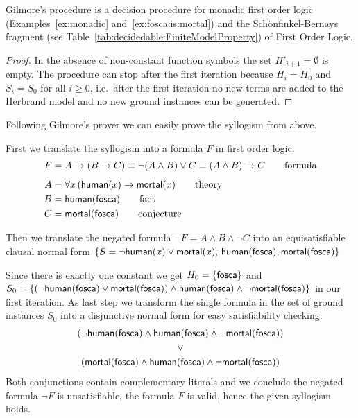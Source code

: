 \begin{lemma}
	Gilmore's procedure is a decision procedure for monadic first order logic
	(Examples~\ref{ex:monadic} and~\ref{ex:fosca:is:mortal})
	and the Schönfinkel-Bernays fragment
	(see Table~\ref{tab:decidedable:FiniteModelProperty})
	of First Order Logic.
\end{lemma}

\begin{proof}
	In the absence of non-constant function symbols the set \( H'_{i+1} = \emptyset \) is empty.
	The procedure can stop after the first iteration because
	\( H_i = H_0 \) and \( S_i = S_0 \) for all \( i\geq0 \),
	i.e.~after the first iteration
	no new terms are added to the Herbrand model
	and no new ground instances can be generated.
\end{proof}

Following Gilmore's prover we can easily prove the syllogism from above.

\begin{example}\label{ex:fosca:is:mortal}
	First we translate the syllogism into a formula \( F \) in first order logic.
	\begin{align*}
	F &= A \rightarrow (B \rightarrow C) \equiv \lnot(A\land B) \lor C \equiv (A\land B)\rightarrow C
	\tag*{formula}
	\\[0.5em]
	A &= \forall x \, ( \mathsf{human}(x) \rightarrow \mathsf{mortal}(x)
	\tag*{theory}
	\\
	B &= \mathsf{human}(\mathsf{fosca})
	\tag*{fact}
	\\
	C &= \mathsf{mortal}(\mathsf{fosca})
	\tag*{conjecture}
	\end{align*}



	Then we translate the negated formula \( \lnot F = A\land B \land\lnot C \) 
	into an equisatisfiable clausal normal form 
	\( \{
		S = 
		\lnot \mathsf{human}(x) \lor \mathsf{mortal}(x),\,
		\mathsf{human}(\mathsf{fosca}), \mathsf{mortal}(\mathsf{fosca})
	\} \)
	
	Since there is exactly one constant we get
	\( H_0 = \{ \mathsf{fosca} \} \) and
	\( S_0 =
	 \{
	(\lnot\mathsf{human}(\mathsf{fosca})\lor\mathsf{mortal}(\mathsf{fosca}))\land\mathsf{human}(\mathsf{fosca})\land\lnot\mathsf{mortal}(\mathsf{fosca})
	\} \) in our first iteration.
	As last step we transform the single formula in
	the set of ground instances \( S_0 \) into a disjunctive normal form
	for easy satisfiability checking.
	\begin{gather*}
	(\lnot\mathsf{human}(\mathsf{fosca})\land\mathsf{human}(\mathsf{fosca})\land\lnot\mathsf{mortal}(\mathsf{fosca}))
	\\
	\lor
	\\
	(\mathsf{mortal}(\mathsf{fosca})\land\mathsf{human}(\mathsf{fosca})\land\lnot\mathsf{mortal}(\mathsf{fosca}))
	\end{gather*}
	Both conjunctions contain complementary literals and we conclude 
	the negated formula \( \lnot F \) is unsatisfiable, 
	the formula \( F \) is valid,
	hence the given syllogism holds.
\end{example}

